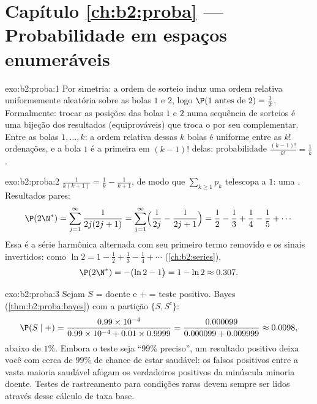 \section*{Capítulo \ref{ch:b2:proba} --- Probabilidade em espaços enumeráveis}

\begin{solution}{exo:b2:proba:1}
Por simetria: a ordem de sorteio induz uma ordem relativa uniformemente
aleatória sobre as bolas $1$ e $2$, logo $\P(1 \text{ antes de } 2) =
\frac12$. Formalmente: trocar as posições das bolas $1$ e $2$
numa sequência de sorteios é uma bijeção dos resultados (equiprováveis)
que troca o  por seu complementar. Entre as bolas
$1, \dots, k$: a ordem relativa dessas $k$ bolas é uniforme
entre as $k!$ ordenações, e a bola $1$ é a primeira em $(k-1)!$ delas:
probabilidade $\frac{(k-1)!}{k!} = \frac1k$.
\end{solution}

\begin{solution}{exo:b2:proba:2}
$\frac{1}{k(k+1)} = \frac1k - \frac1{k+1}$, de modo que $\sum_{k\geq1} p_k$
telescopa a $1$: uma . Resultados pares:
\[
\P(2\N^*) = \sum_{j=1}^{\infty}\frac{1}{2j(2j+1)}
= \sum_{j=1}^{\infty}\Bigl(\frac{1}{2j} - \frac{1}{2j+1}\Bigr)
= \frac12 - \frac13 + \frac14 - \frac15 + \cdots
\]
Essa é a série harmônica alternada com seu primeiro termo
removido e os sinais invertidos: como $\ln 2 = 1 - \frac12 + \frac13 -
\frac14 + \cdots$ (\cref{ch:b2:series}),
\[
\P(2\N^*) = -\bigl(\ln 2 - 1\bigr) = 1 - \ln 2 \approx 0.307 .
\]
\end{solution}

\begin{solution}{exo:b2:proba:3}
Sejam $S$ = doente e $+$ = teste positivo. Bayes
(\cref{thm:b2:proba:bayes}) com a partição $\{S, S^c\}$:
\[
\P(S \mid +)
= \frac{0.99 \times 10^{-4}}
       {0.99 \times 10^{-4} + 0.01 \times 0.9999}
= \frac{0.000099}{0.000099 + 0.009999}
\approx 0.0098 ,
\]
abaixo de $1\%$. Embora o teste seja ``99\% preciso'', um resultado
positivo deixa você com cerca de $99\%$ de chance de estar saudável: os
falsos positivos entre a vasta maioria saudável afogam os verdadeiros
positivos da minúscula minoria doente. Testes de rastreamento para
condições raras devem sempre ser lidos através desse cálculo
de taxa base.
\end{solution}

